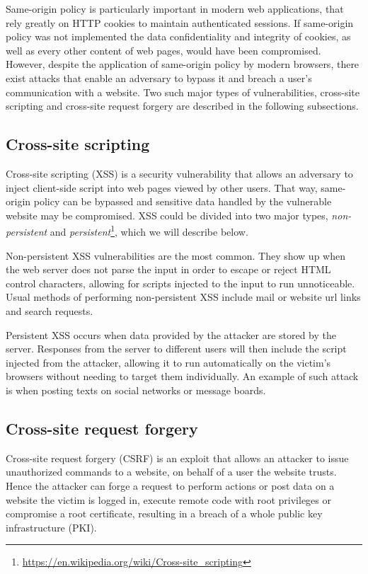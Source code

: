 Same-origin policy is particularly important in modern web applications, that
rely greatly on HTTP cookies to maintain authenticated sessions. If same-origin
policy was not implemented the data confidentiality and integrity of cookies, as
well as every other content of web pages, would have been compromised. However,
despite the application of same-origin policy by modern browsers, there exist
attacks that enable an adversary to bypass it and breach a user's communication
with a website. Two such major types of vulnerabilities, cross-site scripting
and cross-site request forgery are described in the following subsections.

\subsection{Cross-site scripting}

Cross-site scripting (XSS) is a security vulnerability that allows an adversary
to inject client-side script into web pages viewed by other users. That way,
same-origin policy can be bypassed and sensitive data handled by the vulnerable
website may be compromised. XSS could be divided into two major types,
\textit{non-persistent} and
\textit{persistent}\footnote{\url{https://en.wikipedia.org/wiki/Cross-site_scripting}},
which we will describe below.

Non-persistent XSS vulnerabilities are the most common. They show up when the
web server does not parse the input in order to escape or reject HTML control
characters, allowing for scripts injected to the input to run unnoticeable.
Usual methods of performing non-persistent XSS include mail or website url links
and search requests.

Persistent XSS occurs when data provided by the attacker are stored by the
server. Responses from the server to different users will then include the
script injected from the attacker, allowing it to run automatically on the
victim's browsers without needing to target them individually. An example of
such attack is when posting texts on social networks or message boards.

\subsection{Cross-site request forgery}

Cross-site request forgery (CSRF) is an exploit that allows an attacker to issue
unauthorized commands to a website, on behalf of a user the website trusts.
Hence the attacker can forge a request to perform actions or post data on a
website the victim is logged in, execute remote code with root privileges or
compromise a root certificate, resulting in a breach of a whole public key
infrastructure (PKI).

